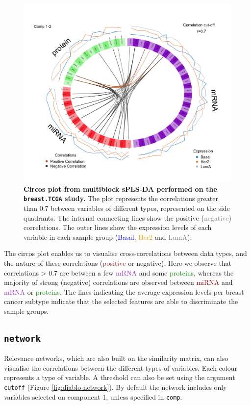 \documentclass[]{book}
\begin{document}
\begin{figure}

{\centering \includegraphics[width=0.5\linewidth]{Figures/DIABLO/diablo-circos-1} 

}

\caption{\textbf{Circos plot from multiblock sPLS-DA performed on the \texttt{breast.TCGA} study.} The plot represents the correlations greater than 0.7 between variables of different types, represented on the side quadrants. The internal connecting lines show the \textcolor{chocolate3}{positive} (\textcolor{grey}{negative}) correlations. The outer lines show the expression levels of each variable in each sample group (\textcolor{blue}{Basal}, \textcolor{orange}{Her2} and \textcolor{grey}{LumA}).}\label{fig:diablo-circos}
\end{figure}



The circos plot enables us to visualise cross-correlations between data types, and the nature of these correlations (\textcolor{brown}{positive} or negative). Here we observe that correlations \textgreater{} 0.7 are between a few \textcolor{darkorchid}{mRNA} and some \textcolor{green}{proteins}, whereas the majority of strong (negative) correlations are observed between \textcolor{darkred}{miRNA} and \textcolor{darkorchid}{mRNA} or \textcolor{green}{proteins}. The lines indicating the average expression levels per breast cancer subtype indicate that the selected features are able to discriminate the sample groups.

\hypertarget{network}{%
\subsection{\texorpdfstring{\texttt{network}}{network}}\label{network}}

Relevance networks, which are also built on the similarity matrix, can also visualise the correlations between the different types of variables. Each colour represents a type of variable. A threshold can also be set using the argument \texttt{cutoff} (Figure \ref{fig:diablo-network}). By default the network includes only variables selected on component 1, unless specified in \texttt{comp}.
\end{document}

